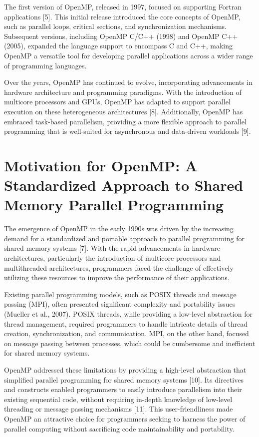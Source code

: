 \documentclass[12pt,conference]{IEEEtran}
\begin{document}
The first version of OpenMP, released in 1997, focused on supporting Fortran applications [5]. This initial release introduced the core concepts of OpenMP, such as parallel loops, critical sections, and synchronization mechanisms. Subsequent versions, including OpenMP C/C++ (1998) and OpenMP C++ (2005), expanded the language support to encompass C and C++, making OpenMP a versatile tool for developing parallel applications across a wider range of programming languages.

Over the years, OpenMP has continued to evolve, incorporating advancements in hardware architecture and programming paradigms. With the introduction of multicore processors and GPUs, OpenMP has adapted to support parallel execution on these heterogeneous architectures [8]. Additionally, OpenMP has embraced task-based parallelism, providing a more flexible approach to parallel programming that is well-suited for asynchronous and data-driven workloads [9].

\section{Motivation for OpenMP: A Standardized Approach to Shared Memory Parallel Programming}
The emergence of OpenMP in the early 1990s was driven by the increasing demand for a standardized and portable approach to parallel programming for shared memory systems [7]. With the rapid advancements in hardware architectures, particularly the introduction of multicore processors and multithreaded architectures, programmers faced the challenge of effectively utilizing these resources to improve the performance of their applications.

Existing parallel programming models, such as POSIX threads and message passing (MPI), often presented significant complexity and portability issues (Mueller et al., 2007). POSIX threads, while providing a low-level abstraction for thread management, required programmers to handle intricate details of thread creation, synchronization, and communication. MPI, on the other hand, focused on message passing between processes, which could be cumbersome and inefficient for shared memory systems.

OpenMP addressed these limitations by providing a high-level abstraction that simplified parallel programming for shared memory systems [10]. Its directives and constructs enabled programmers to easily introduce parallelism into their existing sequential code, without requiring in-depth knowledge of low-level threading or message passing mechanisms [11]. This user-friendliness made OpenMP an attractive choice for programmers seeking to harness the power of parallel computing without sacrificing code maintainability and portability.
\end{document}
